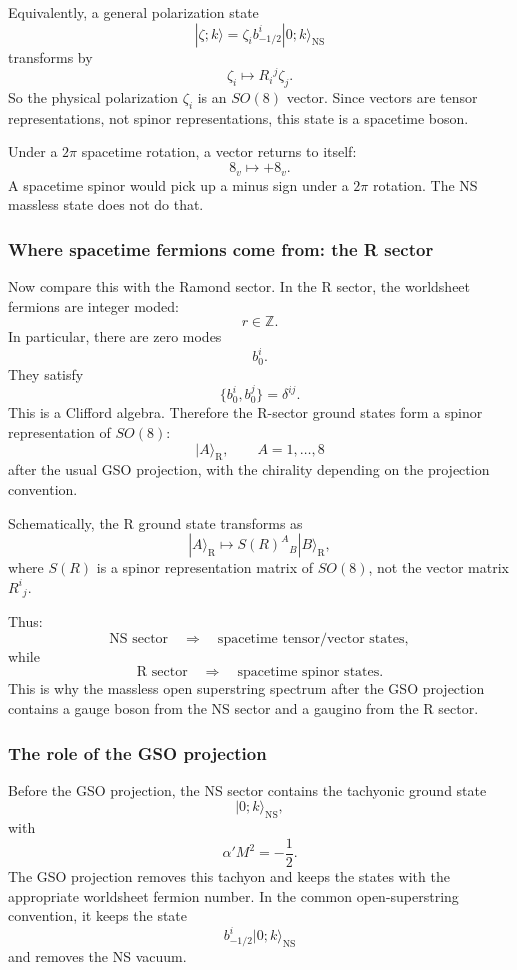 \documentclass[
  10pt,
  a4paper,
  openany]{book}
\begin{document}
Equivalently, a general polarization state \[
|\zeta;k\rangle
=
\zeta_i b_{-1/2}^i|0;k\rangle_{\text{NS}}
\] transforms by \[
\zeta_i
\longmapsto
R_i{}^j\zeta_j.
\] So the physical polarization \(\zeta_i\) is an \(SO(8)\) vector.
Since vectors are tensor representations, not spinor representations,
this state is a spacetime boson.

Under a \(2\pi\) spacetime rotation, a vector returns to itself: \[
8_v
\longmapsto
+8_v.
\] A spacetime spinor would pick up a minus sign under a \(2\pi\)
rotation. The NS massless state does not do that.

\subsubsection{Where spacetime fermions come from: the R
sector}\label{where-spacetime-fermions-come-from-the-r-sector}

Now compare this with the Ramond sector. In the R sector, the worldsheet
fermions are integer moded: \[
r\in\mathbb Z.
\] In particular, there are zero modes \[
b_0^i.
\] They satisfy \[
\{b_0^i,b_0^j\}
=
\delta^{ij}.
\] This is a Clifford algebra. Therefore the R-sector ground states form
a spinor representation of \(SO(8)\): \[
|A\rangle_{\text{R}},
\qquad
A=1,\dots,8
\] after the usual GSO projection, with the chirality depending on the
projection convention.

Schematically, the R ground state transforms as \[
|A\rangle_{\text{R}}
\longmapsto
S(R)^A{}_B |B\rangle_{\text{R}},
\] where \(S(R)\) is a spinor representation matrix of \(SO(8)\), not
the vector matrix \(R^i{}_j\).

Thus: \[
\text{NS sector}
\quad
\Rightarrow
\quad
\text{spacetime tensor/vector states},
\] while \[
\text{R sector}
\quad
\Rightarrow
\quad
\text{spacetime spinor states}.
\] This is why the massless open superstring spectrum after the GSO
projection contains a gauge boson from the NS sector and a gaugino from
the R sector.

\subsubsection{The role of the GSO
projection}\label{the-role-of-the-gso-projection}

Before the GSO projection, the NS sector contains the tachyonic ground
state \[
|0;k\rangle_{\text{NS}},
\] with \[
\alpha' M^2=-\frac{1}{2}.
\] The GSO projection removes this tachyon and keeps the states with the
appropriate worldsheet fermion number. In the common open-superstring
convention, it keeps the state \[
b_{-1/2}^i|0;k\rangle_{\text{NS}}
\] and removes the NS vacuum.
\end{document}
